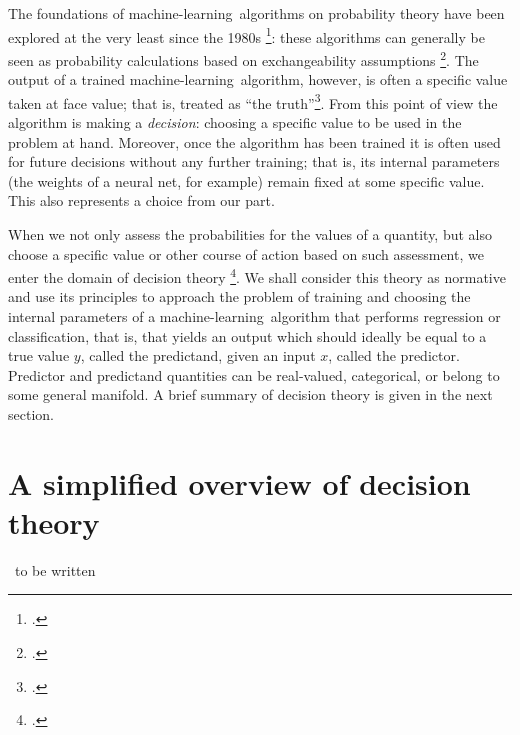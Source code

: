 \documentclass[\ifafour a4paper,12pt,\else a5paper,10pt,\fi%
onecolumn,oneside,article,%
british%
]{memoir}
\theoremstyle{remark}
\theoremstyle{innote}
\newcommand*{\citep}{\footcites}
\renewcommand*{\|}[1][]{\nonscript\:#1\vert\nonscript\:\mathopen{}}
\newcommand*{\sect}{\S}%
\newcommand*{\chap}{ch.}%
\newcommand*{\chaps}{chs}%
\newcommand*{\cf}{{cf.}}
\newcommand*{\wrench}{{\fontencoding{U}\fontfamily{fontawesomethree}\selectfont\symbol{114}}}
\newcommand{\mynote}[1]{ {\color{notecolour}#1}}
\newcommand*{\ml}{machine-learning}
\begin{document}


The foundations of \ml\ algorithms on probability theory have been explored
at the very least since the 1980s
\citep{tishbyetal1989,levinetal1990,mackay1992,mackay1992b,mackay1992c,mackay1992d}[esp.
Part~V]{mackay1995_r2005}{neal1996}: these algorithms can generally be seen
as probability calculations based on exchangeability assumptions
\citep[\chap~4]{bernardoetal1994_r2000}. The output of a trained \ml\
algorithm, however, is often a specific value taken at face value; that is,
treated as \enquote{the truth}\citep[\cf][\sect~3]{mackay1992b}. From this
point of view the algorithm is making a \emph{decision}: choosing a
specific value to be used in the problem at hand. Moreover, once the
algorithm has been trained it is often used for future decisions without
any further training; that is, its internal parameters (the weights of a
neural net, for example) remain fixed at some specific value. This also
represents a choice from our part.

When we not only assess the probabilities for the values of a quantity, but
also choose a specific value or other course of action based on such
assessment, we enter the domain of decision theory
\citep{savage1954_r1972,raiffaetal1961_r2000,berger1980_r1985}[\chap~2]{bernardoetal1994_r2000}{prattetal1995_r1996}[\chaps~13--14]{jaynes1994_r2003}[for
a charming introduction see][]{raiffa1968_r1970}. We shall consider this
theory as normative and use its principles to approach the problem of
training and choosing the internal parameters of a \ml\ algorithm that
performs regression or classification, that is, that yields an output which
should ideally be equal to a true value $y$, called the predictand, given
an input $x$, called the predictor. Predictor and predictand quantities can
be real-valued, categorical, or belong to some general manifold. A brief
summary of decision theory is given in the next section.

\section{A simplified overview of decision theory}
\label{sec:dec_theory_overview}

\mynote{\wrench\ to be written}
\end{document}
